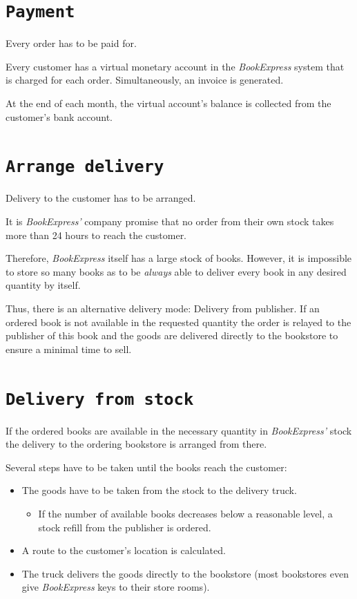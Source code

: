 \section{\texttt{Payment}}
Every order has to be paid for.

Every customer has a virtual monetary account in the \emph{BookExpress} system that is charged for each order. Simultaneously, an invoice
is generated.

At the end of each month, the virtual account's balance is collected from the customer's bank account.


\section{\texttt{Arrange delivery}}
Delivery to the customer has to be arranged.

It is \emph{BookExpress'} company promise that no order from their own stock takes more than 24 hours to reach the customer.

Therefore, \emph{BookExpress} itself has a large stock of books. However, it is impossible to store so many books as to be \emph{always}
able to deliver every book in any desired quantity by itself.

Thus, there is an alternative delivery mode: Delivery from publisher. If an ordered book is not available in the requested quantity
the order is relayed to the publisher of this book and the goods are delivered directly to the bookstore to ensure a minimal time to sell.

\section{\texttt{Delivery from stock}}
If the ordered books are available in the necessary quantity in \emph{BookExpress'} stock the delivery to the ordering bookstore is
arranged from there.

Several steps have to be taken until the books reach the customer:
\begin{itemize}
	\item The goods have to be taken from the stock to the delivery truck.
		\begin{itemize}
			\item If the number of available books decreases below a reasonable level, a stock refill from the publisher is ordered.
		\end{itemize}
	\item A route to the customer's location is calculated.
	\item The truck delivers the goods directly to the bookstore (most bookstores even give \emph{BookExpress} keys to their store rooms).
\end{itemize}


